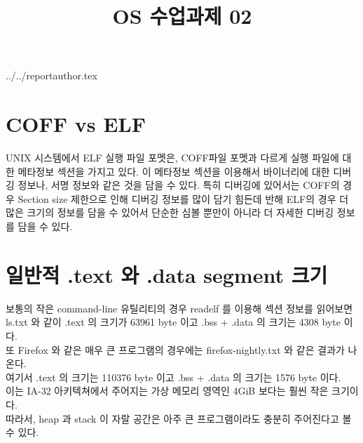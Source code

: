 \documentclass {article}
\begin{document}
\title {OS 수업과제 02}
 {../../reportauthor.tex}
\maketitle

\section {COFF vs ELF}
UNIX 시스템에서 ELF 실행 파일 포멧은, COFF파일 포멧과 다르게 실행 파일에 대한 메타정보 섹션을 가지고 있다. 이 메타정보 섹션을 이용해서 바이너리에 대한 디버깅 정보나, 서명 정보와 같은 것을 담을 수 있다.
특히 디버깅에 있어서는 COFF의 경우 Section size 제한으로 인해 디버깅 정보를 많이 담기 힘든데 반해 ELF의 경우 더 많은 크기의 정보를 담을 수 있어서 단순한 심볼 뿐만이 아니라 더 자세한 디버깅 정보를 담을 수 있다.

\section {일반적 .text 와 .data segment 크기}
보통의 작은 command-line 유틸리티의 경우 readelf 를 이용해 섹션 정보를 읽어보면 
{ls.txt}
와 같이 .text 의 크기가 63961 byte 이고 .bss + .data 의 크기는 4308 byte 이다. \\
또 Firefox 와 같은 매우 큰 프로그램의 경우에는
{firefox-nightly.txt}
와 같은 결과가 나온다.\\
여기서 .text 의 크기는 110376 byte 이고 .bss + .data 의 크기는 1576 byte 이다.\\
이는 IA-32 아키텍쳐에서 주어지는 가상 메모리 영역인 4GiB 보다는 훨씬 작은 크기이다.\\
따라서, heap 과 stack 이 자랄 공간은 아주 큰 프로그램이라도 충분히 주어진다고 볼 수 있다.\\
\end{document}
